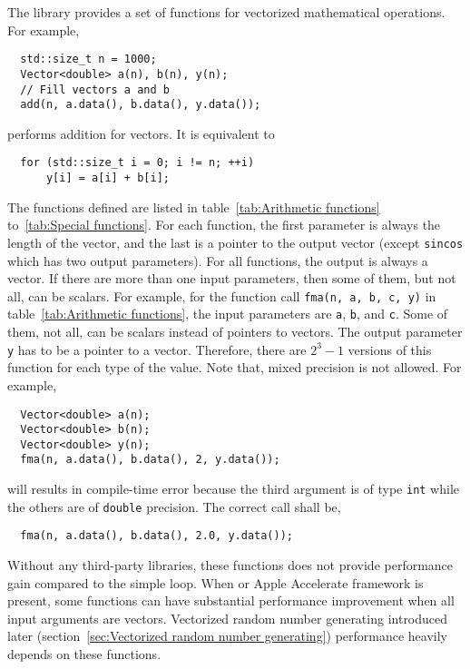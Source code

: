 The library provides a set of functions for vectorized mathematical operations.
For example,
\begin{Verbatim}
  std::size_t n = 1000;
  Vector<double> a(n), b(n), y(n);
  // Fill vectors a and b
  add(n, a.data(), b.data(), y.data());
\end{Verbatim}
performs addition for vectors. It is equivalent to
\begin{Verbatim}
  for (std::size_t i = 0; i != n; ++i)
      y[i] = a[i] + b[i];
\end{Verbatim}
The functions defined are listed in table~\ref{tab:Arithmetic functions}
to~\ref{tab:Special functions}. For each function, the first parameter is
always the length of the vector, and the last is a pointer to the output vector
(except \verb|sincos| which has two output parameters). For all functions, the
output is always a vector. If there are more than one input parameters, then
some of them, but not all, can be scalars. For example, for the function call
\verb|fma(n, a, b, c, y)| in table~\ref{tab:Arithmetic functions}, the input
parameters are \verb|a|, \verb|b|, and \verb|c|. Some of them, not all, can be
scalars instead of pointers to vectors. The output parameter \verb|y| has to be
a pointer to a vector. Therefore, there are $2^3 - 1$ versions of this function
for each type of the value. Note that, mixed precision is not allowed. For
example,
\begin{Verbatim}
  Vector<double> a(n);
  Vector<double> b(n);
  Vector<double> y(n);
  fma(n, a.data(), b.data(), 2, y.data());
\end{Verbatim}
will results in compile-time error because the third argument is of type
\verb|int| while the others are of \verb|double| precision. The correct call
shall be,
\begin{Verbatim}
  fma(n, a.data(), b.data(), 2.0, y.data());
\end{Verbatim}

Without any third-party libraries, these functions does not provide performance
gain compared to the simple loop. When \mkl or Apple Accelerate framework is
present, some functions can have substantial performance improvement when all
input arguments are vectors. Vectorized random number generating
introduced later (section~\ref{sec:Vectorized random number generating})
performance heavily depends on these functions.

